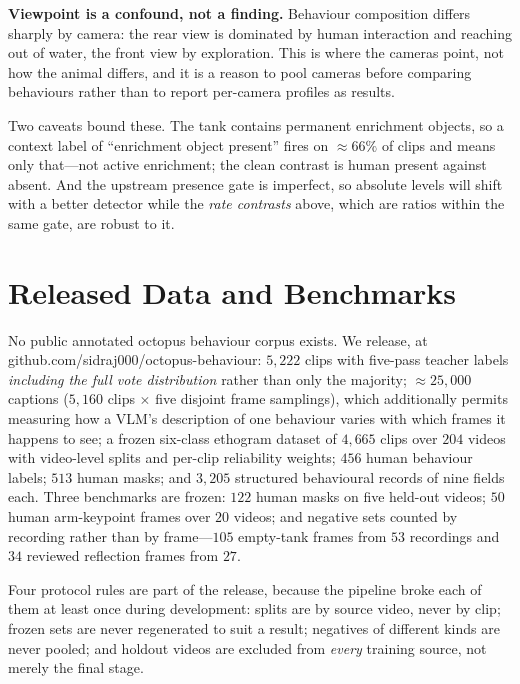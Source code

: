 \documentclass[conference]{IEEEtran}
\begin{document}
\textbf{Viewpoint is a confound, not a finding.} Behaviour composition differs
sharply by camera: the rear view is dominated by human interaction and reaching
out of water, the front view by exploration. This is where the cameras point,
not how the animal differs, and it is a reason to pool cameras before comparing
behaviours rather than to report per-camera profiles as results.

Two caveats bound these. The tank contains permanent enrichment objects, so a
context label of ``enrichment object present'' fires on ${\approx}66\%$ of clips
and means only that---not active enrichment; the clean contrast is human present
against absent. And the upstream presence gate is imperfect, so absolute levels
will shift with a better detector while the \emph{rate contrasts} above, which
are ratios within the same gate, are robust to it.

\section{Released Data and Benchmarks}
\label{sec:data}
No public annotated octopus behaviour corpus exists. We release, at
github.com/sidraj000/octopus-behaviour:
$5{,}222$ clips with five-pass teacher labels \emph{including the full vote
distribution} rather than only the majority; ${\approx}25{,}000$ captions
($5{,}160$ clips $\times$ five disjoint frame samplings), which additionally
permits measuring how a VLM's description of one behaviour varies with which
frames it happens to see; a frozen six-class ethogram dataset of $4{,}665$ clips
over $204$ videos with video-level splits and per-clip reliability weights;
$456$ human behaviour labels; $513$ human masks; and $3{,}205$ structured
behavioural records of nine fields each. Three benchmarks are frozen: $122$ human
masks on five held-out videos; $50$ human arm-keypoint frames over $20$ videos;
and negative sets counted by recording rather than by frame---$105$ empty-tank
frames from $53$ recordings and $34$ reviewed reflection frames from $27$.

Four protocol rules are part of the release, because the pipeline broke each of
them at least once during development: splits are by source video, never by clip;
frozen sets are never regenerated to suit a result; negatives of different kinds
are never pooled; and holdout videos are excluded from \emph{every} training
source, not merely the final stage.
\end{document}
